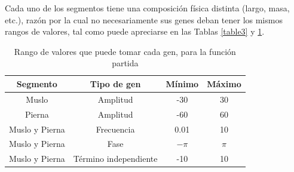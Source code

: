 \documentclass{article}
\begin{document}
Cada uno de los segmentos tiene una composici\'on f\'isica distinta (largo, masa, etc.), raz\'on por la cual no necesariamente sus genes deban tener los mismos rangos de valores, tal como puede apreciarse en las Tablas \ref{table3} y \ref{table4}. \\
\begin{table}[H]%
  \centering
  	\begin{tabular}{ | c | c || c | c | }
	  		\hline
	  		\textbf{Segmento} & \textbf{Tipo de gen} & \textbf{M\'inimo} & \textbf{M\'aximo} \\
			\hline
			Muslo & Amplitud & -30 & 30\\
			\hline
			Pierna & Amplitud & -60 & 60\\ 
			\hline
	  		Muslo y Pierna & Frecuencia & 0.01 & 10 \\ 
	  		\hline
			Muslo y Pierna & Fase & $-\pi$ & $\pi$ \\ 
			\hline
			Muslo y Pierna & T\'ermino independiente & -10 & 10 \\ 
			\hline
	\end{tabular}
  \captionsetup{justification=centering}
  \caption{Rango de valores que puede tomar cada gen, para la funci\'on partida}%
  \label{table4}%
\end{table}
\vspace{1pt}
\end{document}
